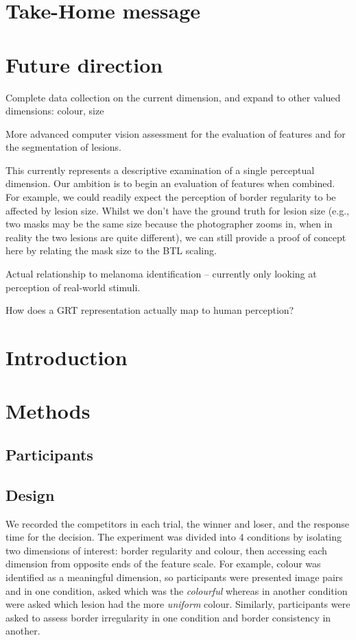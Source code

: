 \documentclass[a4paper, natbib, doc, 12pt]{apa7}
\begin{document}
\section{Take-Home message}


\section{Future direction}
Complete data collection on the current dimension, and expand to other valued dimensions: colour, size

More advanced computer vision assessment for the evaluation of features and for the segmentation of lesions.

This currently represents a descriptive examination of a single perceptual dimension. Our ambition is to begin an evaluation of features when combined. For example, we could readily expect the perception of border regularity to be affected by lesion size. Whilst we don't have the ground truth for lesion size (e.g., two masks may be the same size because the photographer zooms in, when in reality the two lesions are quite different), we can still provide a proof of concept here by relating the mask size to the BTL scaling.

Actual relationship to melanoma identification -- currently only looking at perception of real-world stimuli.

How does a GRT representation actually map to human perception?


\newpage


\section{Introduction}

\section{Methods}
\subsection{Participants}

\subsection{Design}
We recorded the competitors in each trial, the winner and loser, and the response time for the decision. The experiment was divided into 4 conditions by isolating two dimensions of interest: border regularity and colour, then accessing each dimension from opposite ends of the feature scale. For example, colour was identified as a meaningful dimension, so participants were presented image pairs and in one condition, asked which was the \textit{colourful} whereas in another condition were asked which lesion had the more \textit{uniform} colour. Similarly, participants were asked to assess border irregularity in one condition and border consistency in another.
\
\end{document}
